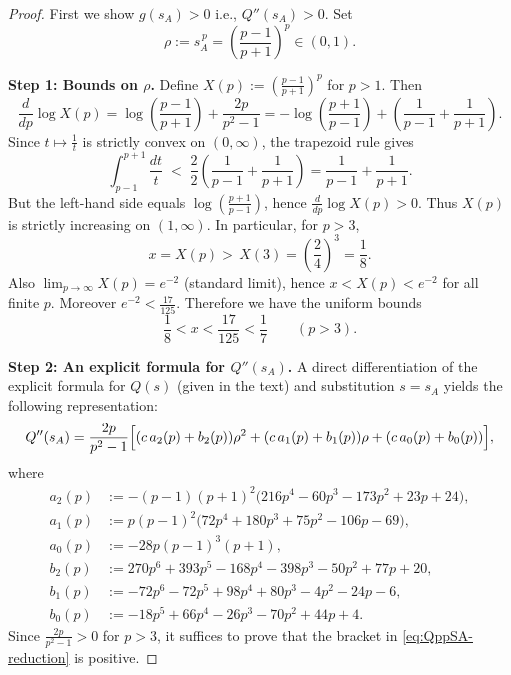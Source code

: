 \documentclass[11pt]{article}
\theoremstyle{definition}
\newcommand{\1}{\mathbf{1}}
\begin{document}
\begin{proof}

First we show $g(s_{A})>0$ i.e., $Q''(s_A)>0$. Set
\[
\rho:=s_A^{\,p}=\left(\frac{p-1}{p+1}\right)^{p}\in(0,1).
\]

\medskip
\noindent\textbf{Step 1: Bounds on $\rho$.}
Define $X(p):=\left(\frac{p-1}{p+1}\right)^p$ for $p>1$. Then
\[
\frac{d}{dp}\log X(p)
=\log\!\left(\frac{p-1}{p+1}\right)+\frac{2p}{p^2-1}
=
-\log\!\left(\frac{p+1}{p-1}\right)+\left(\frac1{p-1}+\frac1{p+1}\right).
\]
Since $t\mapsto \frac1t$ is strictly convex on $(0,\infty)$, the trapezoid rule gives
\[
\int_{p-1}^{p+1}\frac{dt}{t}
\;<\;\frac{2}{2}\left(\frac1{p-1}+\frac1{p+1}\right)
=\frac1{p-1}+\frac1{p+1}.
\]
But the left-hand side equals $\log\!\left(\frac{p+1}{p-1}\right)$, hence
$\frac{d}{dp}\log X(p)>0$. Thus $X(p)$ is strictly increasing on $(1,\infty)$.
In particular, for $p>3$,
\[
x=X(p)>\,X(3)=\left(\frac{2}{4}\right)^3=\frac18.
\]
Also $\displaystyle \lim_{p\to\infty}X(p)=e^{-2}$ (standard limit), hence
$x<X(p)<e^{-2}$ for all finite $p$.
Moreover $e^{-2}<\frac{17}{125}$.
Therefore we have the uniform bounds
\begin{equation}\label{eq:x-bounds-sA}
\frac18<x<\frac{17}{125}<\frac{1}{7}\qquad(p>3).
\end{equation}

\medskip
\noindent\textbf{Step 2: An explicit formula for $Q''(s_A)$.}
A direct differentiation of the explicit formula for $Q(s)$ (given in the text) and substitution $s=s_A$
yields the following representation:
\begin{equation}\label{eq:QppSA-reduction}
Q''(s_A)=\frac{2p}{p^2-1}\Bigl[(c\,a_2(p)+b_2(p))\rho^2+(c\,a_1(p)+b_1(p))\rho+(c\,a_0(p)+b_0(p))\Bigr],
\end{equation}
where
\begin{align*}
a_2(p)&:=-(p-1)(p+1)^2\bigl(216p^4-60p^3-173p^2+23p+24\bigr),\\
a_1(p)&:=p(p-1)^2\bigl(72p^4+180p^3+75p^2-106p-69\bigr),\\
a_0(p)&:=-28p(p-1)^3(p+1),\\
b_2(p)&:=270p^6+393p^5-168p^4-398p^3-50p^2+77p+20,\\
b_1(p)&:=-72p^6-72p^5+98p^4+80p^3-4p^2-24p-6,\\
b_0(p)&:=-18p^5+66p^4-26p^3-70p^2+44p+4.
\end{align*}
Since $\frac{2p}{p^2-1}>0$ for $p>3$, it suffices to prove that the bracket in \eqref{eq:QppSA-reduction}
is positive.


\end{proof}
\end{document}
